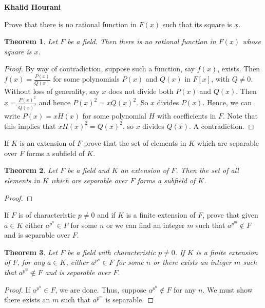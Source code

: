 \documentclass[12pt,leqno]{article}
\numberwithin{equation}{section}
\newcommand{\question}[2] {\vspace{.25in} \fbox{#1} #2 \vspace{.10in}}
\newtheorem*{Thm}{Theorem}
\theoremstyle{definition}
\begin{document}
\thispagestyle{plain}
\begin{flushright}
\large{\textbf{Khalid Hourani\\
}}
\end{flushright}

\question{4}{Prove that there is no rational function in $F(x)$ such that its square is $x$.}

\begin{Thm}
 Let $F$ be a field. Then there is no rational function in $F(x)$ whose square is $x$.
\end{Thm}

\begin{proof}
 By way of contradiction, suppose such a function, say $f(x)$, exists. Then $f(x)=\frac{P(x)}{Q(x)}$ for some polynomials $P(x)$ and $Q(x)$ in $F[x]$, with $Q\not=0$. Without loss of generality, say $x$ does not divide both $P(x)$ and $Q(x)$. Then $x=\frac{P(x)^2}{Q(x)^2}$ and hence $P(x)^2=xQ(x)^2$. So $x$ divides $P(x)$. Hence, we can write $P(x)=xH(x)$ for some polynomial $H$ with coefficients in $F$. Note that this implies that $xH(x)^2=Q(x)^2$, so $x$ divides $Q(x)$. A contradiction.
\end{proof}

\question{11}{If $K$ is an extension of $F$ prove that the set of elements in $K$ which are separable over $F$ forms a subfield of $K$.}

\begin{Thm}
 Let $F$ be a field and $K$ an extension of $F$. Then the set of all elements in $K$ which are separable over $F$ forms a subfield of $K$.
\end{Thm}

\begin{proof}

\end{proof}


\question{12}{If $F$ is of characteristic $p\not=0$ and if $K$ is a finite extension of $F$, prove that given $a\in K$ either $a^{p^n}\in F$ for some $n$ or we can find an integer $m$ such that $a^{p^m}\not\in F$ and is separable over $F$.}

\begin{Thm}
 Let $F$ be a field with characteristic $p\not=0$. If $K$ is a finite extension of $F$, for any $a\in K$, either $a^{p^n}\in F$ for some $n$ or there exists an integer $m$ such that $a^{p^m}\not\in F$ and is separable over $F$.
\end{Thm}

\begin{proof}
 If $a^{p^n}\in F$, we are done. Thus, suppose $a^{p^n}\not\in F$ for any $n$. We must show there exists an $m$ such that $a^{p^m}$ is separable.
\end{proof}
\end{document}

